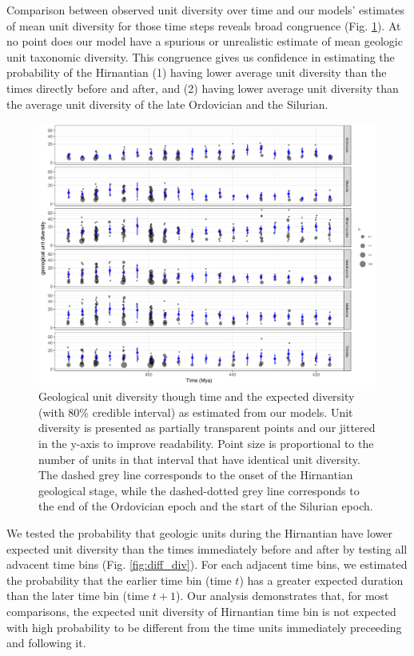 \documentclass[12pt,letterpaper]{article}
\begin{document}
Comparison between observed unit diversity over time and our models' estimates of mean unit diversity for those time steps reveals broad congruence (Fig. \ref{fig:time_div}). At no point does our model have a spurious or unrealistic estimate of mean geologic unit taxonomic diversity. This congruence gives us confidence in estimating the probability of the Hirnantian (1) having lower average unit diversity than the times directly before and after, and (2) having lower average unit diversity than the average unit diversity of the late Ordovician and the Silurian. 
\begin{figure}[ht]
  \centering
  \includegraphics[width=\textwidth,height=0.5\textheight,keepaspectratio=true]{figure/unitdiv_time_diversity}
  \caption{Geological unit diversity though time and the expected diversity (with 80\% credible interval) as estimated from our models. Unit diversity is presented as partially transparent points and our jittered in the y-axis to improve readability. Point size is proportional to the number of units in that interval that have identical unit diversity. The dashed grey line corresponds to the onset of the Hirnantian geological stage, while the dashed-dotted grey line corresponds to the end of the Ordovician epoch and the start of the Silurian epoch.}
  \label{fig:time_div}
\end{figure}

We tested the probability that geologic units during the Hirnantian have lower expected unit diversity than the times immediately before and after by testing all advacent time bins (Fig. \ref{fig:diff_div}). For each adjacent time bins, we estimated the probability that the earlier time bin (time \(t\)) has a greater expected duration than the later time bin (time \(t + 1\)). Our analysis demonstrates that, for most comparisons, the expected unit diversity of Hirnantian time bin is not expected with high probability to be different from the time units immediately preceeding and following it. 
\end{document}
